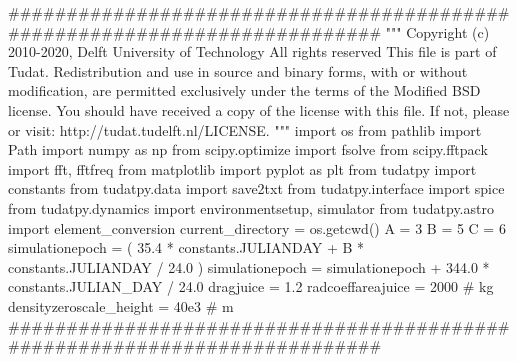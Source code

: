 {}########################################################################### """ Copyright (c) 2010-2020, Delft University of Technology All rights reserved This file is part of Tudat. Redistribution and use in source and binary forms, with or without modification, are permitted exclusively under the terms of the Modified BSD license. You should have received a copy of the license with this file. If not, please or visit: http://tudat.tudelft.nl/LICENSE. """ import os from pathlib import Path import numpy as np from scipy.optimize import fsolve from scipy.fftpack import fft, fftfreq from matplotlib import pyplot as plt from tudatpy import constants from tudatpy.data import save2txt from tudatpy.interface import spice from tudatpy.dynamics import environmentsetup, simulator from tudatpy.astro import element_conversion\markdownRendererInterblockSeparator
{}
\markdownRendererSectionEnd \markdownRendererSectionBegin
{}\markdownRendererInterblockSeparator
{}current_directory = os.getcwd()\markdownRendererInterblockSeparator
{}
\markdownRendererSectionEnd \markdownRendererSectionBegin
{}\markdownRendererInterblockSeparator
{}A = 3 B = 5 C = 6 simulationepoch = ( 35.4 * constants.JULIANDAY + B * constants.JULIANDAY / 24.0 ) simulationepoch = simulationepoch + 344.0 * constants.JULIAN_DAY / 24.0\markdownRendererInterblockSeparator
{}
\markdownRendererSectionEnd \markdownRendererSectionBegin
{}\markdownRendererInterblockSeparator
{}
\markdownRendererSectionEnd \markdownRendererSectionBegin
{}\markdownRendererInterblockSeparator
{}dragjuice = 1.2 radcoeffareajuice = 2000 # kg\markdownRendererInterblockSeparator
{}
\markdownRendererSectionEnd \markdownRendererSectionBegin
{}\markdownRendererInterblockSeparator
{}densityzeroscale_height = 40e3 # m\markdownRendererInterblockSeparator
{}###########################################################################\markdownRendererInterblockSeparator
